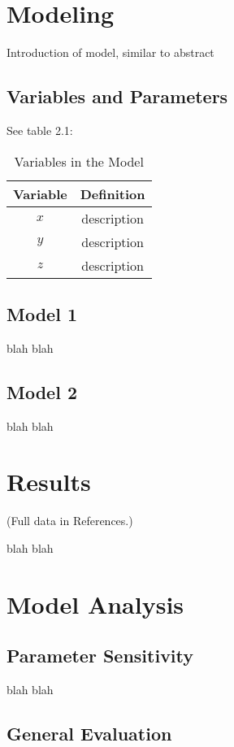 \documentclass{mcmthesis}
\begin{document}
    \section{Modeling}
    Introduction of model, similar to abstract

    \subsection{Variables and Parameters}
    See table 2.1:
    \begin{table}[h!]
        \centering
        \begin{tabular}{cc}
            \toprule
            Variable & Definition      \\
            \midrule
            $x$      & description     \\
            $y$      & description     \\
            $z$      & description     \\
            \bottomrule
        \end{tabular}
        \caption{Variables in the Model}
        \label{tab:my_label}
    \end{table}

    \subsection{Model 1}
    blah blah

    \subsection{Model 2}
    blah blah


    \section{Results}
    \noindent (Full data in References.)

    blah blah


    \section{Model Analysis}

    \subsection{Parameter Sensitivity}
    blah blah

    \subsection{General Evaluation}
\end{document}
